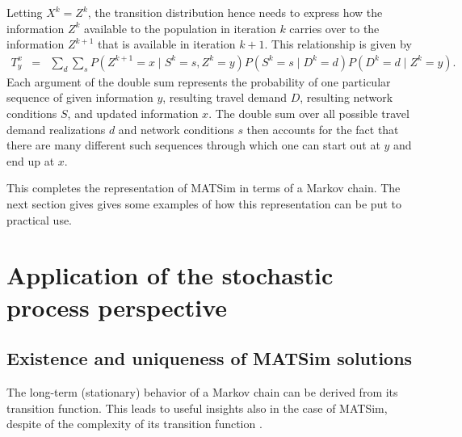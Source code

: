 Letting $X^{k}=Z^{k}$, the transition distribution hence needs to
express how the information $Z^{k}$ available to the population in
iteration $k$ carries over to the information $Z^{k+1}$ that is
available in iteration $k+1$. This relationship is given by
\begin{eqnarray}
T_{y}^{x} & = & \sum_{d}\sum_{s}P(Z^{k+1}=x\mid S^{k}=s,Z^{k}=y)P(S^{k}=s\mid D^{k}=d)P(D^{k}=d\mid Z^{k}=y).\label{eq:matsim-transition-distr}
\end{eqnarray}
Each argument of the double sum represents the probability of one
particular sequence of given information $y$, resulting travel demand
$D$, resulting network conditions $S$, and updated information $x$.
The double sum over all possible travel demand realizations $d$ and
network conditions $s$ then accounts for the fact that there are
many different such sequences through which one can start out at $y$
and end up at $x$.

This completes the representation of MATSim in terms of a Markov chain.
The next section gives gives some examples of how this representation
can be put to practical use.


\section{Application of the stochastic process perspective}


\subsection{\label{sub:Existence-and-uniqueness}Existence and uniqueness of
MATSim solutions}

The long-term (stationary) behavior of a Markov chain can be derived
from its transition function. This leads to useful insights also in
the case of MATSim, despite of the complexity of its transition function
.

